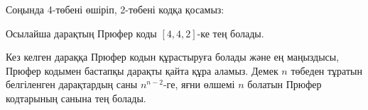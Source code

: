 Соңында 4-төбені өшіріп, 2-төбені кодқа қосамыз:
\begin{center}
\end{center}

Осылайша дарақтың Прюфер коды $[4,4,2]$-ке тең болады.

Кез келген дараққа Прюфер кодын құрастыруға болады
және ең маңыздысы, Прюфер кодымен бастапқы дарақты
қайта құра аламыз. Демек $n$ төбеден тұратын 
белгіленген дарақтардың саны $n^{n-2}$-ге, яғни
өлшемі $n$ болатын Прюфер кодтарының санына тең болады. 

